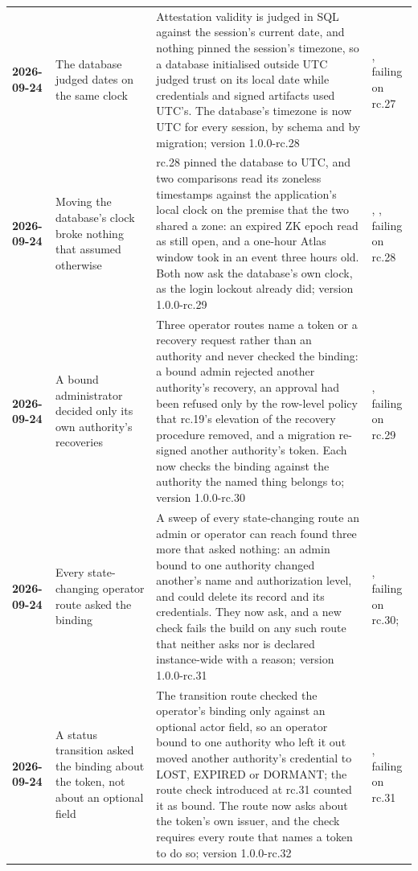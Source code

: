 {\begin{xltabular}{\textwidth}{>{\bfseries\hspace{0pt}}p{0.62in} >{\RaggedRight\arraybackslash\hspace{0pt}}X >{\RaggedRight\arraybackslash\hspace{0pt}}X >{\RaggedRight\arraybackslash\hspace{0pt}}p{1.6in}}
2026-09-24 & The database judged dates on the same clock & Attestation validity is judged in SQL against the session's current date, and nothing pinned the session's timezone, so a database initialised outside UTC judged trust on its local date while credentials and signed artifacts used UTC's. The database's timezone is now UTC for every session, by schema and by migration; version 1.0.0-rc.28 & , failing on rc.27 \\
2026-09-24 & Moving the database's clock broke nothing that assumed otherwise & rc.28 pinned the database to UTC, and two comparisons read its zoneless timestamps against the application's local clock on the premise that the two shared a zone: an expired ZK epoch read as still open, and a one-hour Atlas window took in an event three hours old. Both now ask the database's own clock, as the login lockout already did; version 1.0.0-rc.29 & , , failing on rc.28 \\
2026-09-24 & A bound administrator decided only its own authority's recoveries & Three operator routes name a token or a recovery request rather than an authority and never checked the binding: a bound admin rejected another authority's recovery, an approval had been refused only by the row-level policy that rc.19's elevation of the recovery procedure removed, and a migration re-signed another authority's token. Each now checks the binding against the authority the named thing belongs to; version 1.0.0-rc.30 & , failing on rc.29 \\
2026-09-24 & Every state-changing operator route asked the binding & A sweep of every state-changing route an admin or operator can reach found three more that asked nothing: an admin bound to one authority changed another's name and authorization level, and could delete its record and its credentials. They now ask, and a new check fails the build on any such route that neither asks nor is declared instance-wide with a reason; version 1.0.0-rc.31 & , failing on rc.30;  \\
2026-09-24 & A status transition asked the binding about the token, not about an optional field & The transition route checked the operator's binding only against an optional actor field, so an operator bound to one authority who left it out moved another authority's credential to LOST, EXPIRED or DORMANT; the route check introduced at rc.31 counted it as bound. The route now asks about the token's own issuer, and the check requires every route that names a token to do so; version 1.0.0-rc.32 & , failing on rc.31 \\

\end{xltabular}}
